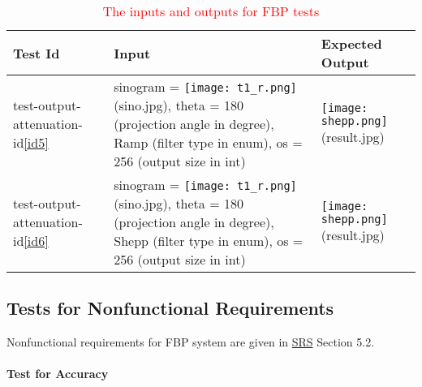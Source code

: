 \documentclass[12pt, titlepage]{article}
\newcommand{\add}{\textcolor{red}}
\begin{document}
\begin{table}[H]
  \centering
  \begin{tabularx}{\linewidth}{|X|p{6cm}|p{4cm}|}
    \hline
    Test Id                                  & Input
                                             & Expected Output
    \\
    \hline
    test-output-attenuation-id\ref{id5}
                                             & \centering sinogram
                                               = \texttt{[image: t1\_r.png]}
                                               (sino.jpg),
                                               theta = 180 (projection angle in
                                               degree),
                                               Ramp (filter type in enum),
                                               os = 256 (output size in int)
                                             & \texttt{[image: shepp.png]} (result.jpg)
    \\
    \hline
    test-output-attenuation-id\ref{id6}
                                             & \centering sinogram
                                               = \texttt{[image: t1\_r.png]}
                                               (sino.jpg),
                                               theta = 180 (projection angle in
                                               degree),
                                               Shepp (filter type in enum),
                                               os = 256 (output size in int)
                                             & \texttt{[image: shepp.png]} (result.jpg)
    \\ \hline
  \end{tabularx}
  \caption{\add{The inputs and outputs for FBP tests}}
  \label{Table B}
\end{table}
\subsection{Tests for Nonfunctional Requirements} \label{TNFR}
Nonfunctional requirements for FBP system are given in
\href{https://github.com/marischan888/Computed-Tomography-Image-Reconstruction/blob/main/docs/SRS/SRS.pdf}{SRS}
Section 5.2.

\paragraph{Test for Accuracy}
\end{document}
